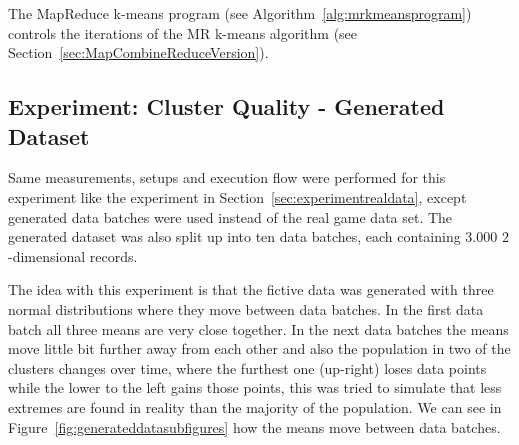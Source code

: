The MapReduce k-means program (see Algorithm~\ref{alg:mrkmeansprogram}) controls the iterations of the MR k-means algorithm (see Section~\ref{sec:MapCombineReduceVersion}).

\subsection{Experiment: Cluster Quality - Generated Dataset}
Same measurements, setups and execution flow were performed for this experiment like the experiment in Section~\ref{sec:experimentrealdata}, except generated data batches were used instead of the real game data set. The generated dataset was also split up into ten data batches, each containing $3.000$ $2$-dimensional records. 

The idea with this experiment is that the fictive data was generated with three normal distributions where they move between data batches. In the first data batch all three means are very close together. In the next data batches the means move little bit further away from each other and also the population in two of the clusters changes over time, where the furthest one (up-right) loses data points while the lower to the left gains those points, this was tried to simulate that less extremes are found in reality than the majority of the population. We can see in Figure~\ref{fig:generateddatasubfigures} how the means move between data batches.

